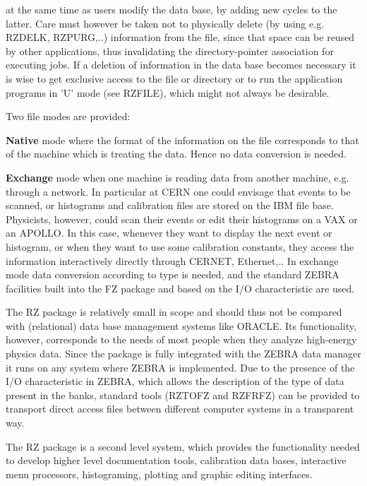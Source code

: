 at the same time as users modify the data base, by adding new cycles
to the latter. Care must however be taken not to physically delete
(by using e.g. RZDELK, RZPURG,..) information from the file, since
that space can be reused by other applications, thus
invalidating the directory-pointer association for executing jobs.
If a deletion of information in the data base becomes necessary it is
wise to get exclusive access to the file or directory or to
run the application programs in 'U' mode (see RZFILE), which might
not always be desirable.
\par Two file modes are provided:
\begin{OL}
\item {\bf Native}
mode where the format of the information on the file corresponds to
that of the machine which is treating the data.
Hence no data conversion is needed.
\item {\bf Exchange}
mode when one machine is reading data from another machine, e.g. through
a network. In particular at CERN one could envisage that
events to be scanned, or
histograms and calibration files are stored on the IBM file base.
Physicists, however, could scan their events
or edit their histograms on a VAX or an APOLLO.
In this case, whenever
they want to display the next event or histogram, or when they want to
use some calibration constants,
they access the information interactively directly through CERNET,
Ethernet,..
In exchange mode data conversion according to type is needed, and the
standard ZEBRA facilities built into the FZ package and based on
the I/O characteristic are used.
\end{OL}
\par The RZ package is relatively small in scope and should thus not
be compared with (relational) data base management
systems like ORACLE. Its functionality, however, corresponds to
the needs of most people when they analyze high-energy physics
data. Since the package is fully integrated with the ZEBRA
data manager it runs on any system where ZEBRA is implemented.
Due to the presence of the I/O characteristic in ZEBRA,
which allows the description of the type of data present in the banks,
standard tools (RZTOFZ and RZFRFZ) can be provided to transport direct
access files between different computer systems in a transparent way.
\par The RZ package is a second level system, which provides
the functionality needed to develop higher level
documentation tools, calibration
data bases, interactive menu processors, histograming, plotting and
graphic editing interfaces.

